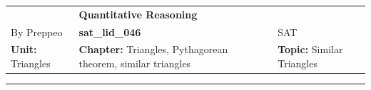 \documentclass[11pt,paper=a4,answers]{exam}
\begin{document}
\begin{center}
    \centering
    \renewcommand{\arraystretch}{1.5}
    \begin{tabularx}{\textwidth}{YYY}
    & \normalsize\bf{{\Large{{Quantitative Reasoning}}}} & \\
    By Preppeo & \normalsize\bf{{sat\_lid\_046}} & SAT\\
    \normalsize{{\textbf{{Unit:}} Triangles}} & \normalsize{{\textbf{{Chapter:}} Triangles, Pythagorean theorem, similar triangles}} & \normalsize{{\textbf{{Topic:}} Similar Triangles}} \\
    \end{tabularx}
\end{center}
\par\noindent\rule{\textwidth}{1pt}
\end{document}
